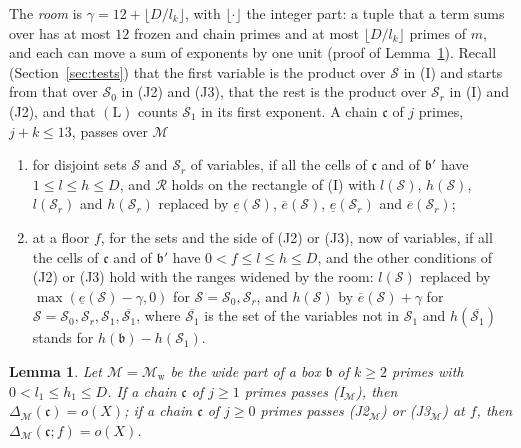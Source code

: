 \documentclass[11pt]{article}
\newtheorem{lemma}[theorem]{Lemma}
\theoremstyle{definition}
\begin{document}
The \emph{room} is $\gamma = 12 + \lfloor D/l_k \rfloor$, with $\lfloor\cdot\rfloor$ the integer part: a tuple that a
term sums over has at most $12$ frozen and chain primes and at most $\lfloor D/l_k \rfloor$ primes of $m$, and each
can move a sum of exponents by one unit (proof of Lemma~\ref{lem:frozen-tests}). Recall (Section~\ref{sec:tests}) that
the first variable is the product over $\mathcal S$ in (I) and starts from that over $\mathcal S_0$ in (J2) and (J3),
that the rest is the product over $\mathcal S_r$ in (I) and (J2), and that $(\mathrm L)$ counts $\mathcal S_1$ in its
first exponent. A chain $\mathfrak c$ of $j$ primes, $j + k \le 13$, passes over $\mathcal M$
\begin{enumerate}
\item[(I$_{\mathcal M}$)] for disjoint sets $\mathcal S$ and $\mathcal S_r$ of variables, if all the cells of $\mathfrak
  c$ and of $\mathfrak b'$ have $1 \le l \le h \le D$, and $\mathcal R$ holds on the rectangle of (I) with $l(\mathcal
  S)$, $h(\mathcal S)$, $l(\mathcal S_r)$ and $h(\mathcal S_r)$ replaced by $\underline e(\mathcal S)$, $\overline
  e(\mathcal S)$, $\underline e(\mathcal S_r)$ and $\overline e(\mathcal S_r)$;
\item[(J2$_{\mathcal M}$), (J3$_{\mathcal M}$)] at a floor $f$, for the sets and the side of (J2) or (J3), now of
  variables, if all the cells of $\mathfrak c$ and of $\mathfrak b'$ have $0 < f \le l \le h \le D$, and the other
  conditions of (J2) or (J3) hold with the ranges widened by the room: $l(\mathcal S)$ replaced by
  $\max(\underline e(\mathcal S) - \gamma, 0)$ for $\mathcal S = \mathcal S_0, \mathcal S_r$, and $h(\mathcal S)$ by
  $\overline e(\mathcal S) + \gamma$ for $\mathcal S = \mathcal S_0, \mathcal S_r, \mathcal S_1, \overline{\mathcal
  S_1}$, where $\overline{\mathcal S_1}$ is the set of the variables not in $\mathcal S_1$ and $h(\overline{\mathcal
  S_1})$ stands for $h(\mathfrak b) - h(\mathcal S_1)$.
\end{enumerate}

\begin{lemma}\label{lem:frozen-tests}
Let $\mathcal M = \mathcal M_{\mathrm w}$ be the wide part of a box $\mathfrak b$ of $k \ge 2$ primes with $0 < l_1 \le
h_1 \le D$. If a chain $\mathfrak c$ of $j \ge 1$ primes passes (I$_{\mathcal M}$), then $\Delta_{\mathcal M}(\mathfrak
c)
= o(X)$; if a chain $\mathfrak c$ of $j \ge 0$ primes passes (J2$_{\mathcal M}$) or (J3$_{\mathcal M}$) at $f$, then
$\Delta_{\mathcal M}(\mathfrak c; f) = o(X)$.
\end{lemma}
\end{document}

